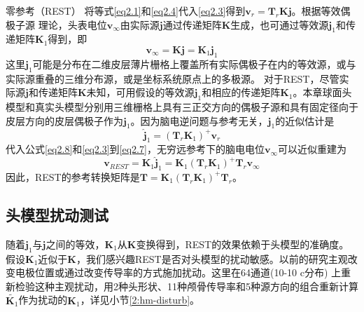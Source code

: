 零参考（REST）
将等式\eqref{eq2.1}和\eqref{eq2.4}代入\eqref{eq2.3}得到$\mathbf{v}_r=\mathbf{T}_{r}\mathbf{Kj}$。根据等效偶极子源
理论，头表电位$\mathbf{v}_{\infty}$由实际源$\mathbf{j}$通过传递矩阵$\mathbf{K}$生成，也可通过等效源$\mathbf{j}_1$和传递矩阵$\mathbf{K}_1$得到，即
\begin{equation}\label{eq2.7}
\mathbf{v}_{\infty}=\mathbf{Kj}=\mathbf{K}_1\mathbf{j}_1
\end{equation}
这里$\mathbf{j}_1$可能是分布在二维皮层薄片栅格上覆盖所有实际偶极子在内的等效源，或与实际源重叠的三维分布源，或是坐标系统原点上的多极源。 对于REST，尽管实际源$\mathbf{j}$和传递矩阵$\mathbf{K}$未知，可用假设的等效源$\mathbf{j}_1$和相应的传递矩阵$\mathbf{K}_1$。本章球面头模型和真实头模型分别用三维栅格上具有三正交方向的偶极子源和具有固定径向于皮层方向的皮层偶极子作为$\mathbf{j}_1$。因为脑电逆问题与参考无关，$\mathbf{j}_1$的近似估计是
\begin{equation}\label{eq2.8}
\hat{\mathbf{j}}_1=(\mathbf{T}_r\mathbf{K}_1)^+\mathbf{v}_r
\end{equation}
代入公式\eqref{eq2.8}和\eqref{eq2.3}到\eqref{eq2.7}，无穷远参考下的脑电电位$\mathbf{v}_{\infty}$可以近似重建为
\begin{equation}\label{eq2.9}
\mathbf{v}_{REST}=\mathbf{K}_1\hat{\mathbf{j}}_1=\mathbf{K}_1(\mathbf{T}_r\mathbf{K}_1)^+\mathbf{T}_r\mathbf{v}_\infty
\end{equation}
因此，REST的参考转换矩阵是$\mathbf{T}=\mathbf{K}_1(\mathbf{T}_r\mathbf{K}_1)^+\mathbf{T}_r$。
\subsection{头模型扰动测试}
随着$\mathbf{j}_1$与$\mathbf{j}$之间的等效，$\mathbf{K}_1$从$\mathbf{K}$变换得到，REST的效果依赖于头模型的准确度。假设$\mathbf{K}_1$近似于$\mathbf{K}$，我们感兴趣REST是否对头模型的扰动敏感。以前的研究主观改变电极位置或通过改变传导率的方式施加扰动。这里在64通道(10-10 c分布) 上重新检验这种主观扰动，用2种头形状、11种颅骨传导率和5种源方向的组合重新计算$\tilde{\mathbf{K}_1}$作为扰动的$\mathbf{K}_1$，详见小节\ref{2:hm-disturb}。

